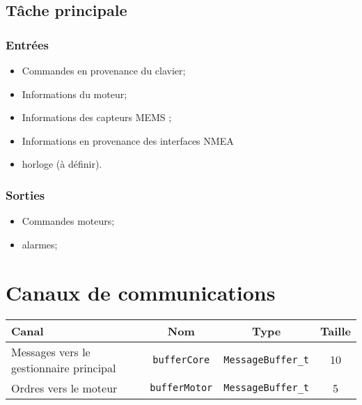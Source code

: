 \documentclass[a4paper,11pt]{report}
\begin{document}
\subsection{Tâche principale}
\subsubsection{Entrées}
\begin{itemize}
  \item Commandes en provenance du clavier;
  \item Informations du moteur;
  \item Informations des capteurs MEMS ;
  \item Informations en provenance des interfaces NMEA
  \item horloge (à définir).
\end{itemize}
\subsubsection{Sorties}
\begin{itemize}
  \item Commandes moteurs;
  \item alarmes;
\end{itemize}

\section{Canaux de communications}

\begin{tabular}{|l|c|c|c|}
\hline
Canal & Nom & Type & Taille \\
\hline
Messages vers le gestionnaire principal & \texttt{bufferCore} & \texttt{MessageBuffer\_t} & 10 \\
\hline 
Ordres vers le moteur & \texttt{bufferMotor} & \texttt{MessageBuffer\_t} & 5 \\ 
\hline
\end{tabular}
\end{document}
